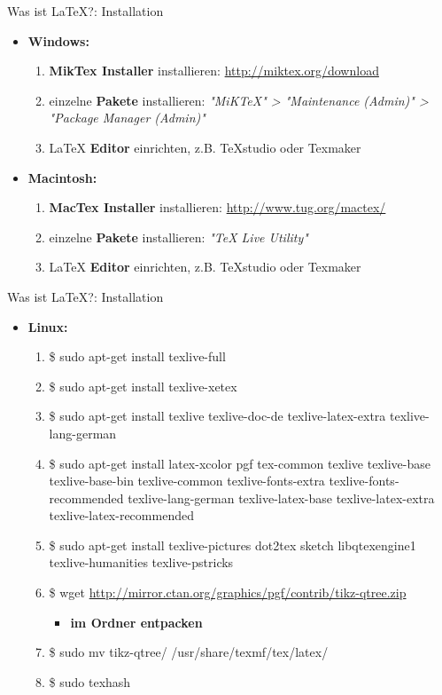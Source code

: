 \begin{frame}{Was ist \LaTeX?: Installation}
\begin{itemize}
\item \textbf{Windows:}
\begin{enumerate}
\item \textbf{MikTex Installer} installieren: \url{http://miktex.org/download}
\item einzelne \textbf{Pakete} installieren: \textit{"MiKTeX" > "Maintenance (Admin)" > "Package Manager (Admin)"}
\item \LaTeX{} \textbf{Editor} einrichten, z.B. TeXstudio oder Texmaker
\newline
\end{enumerate}
\item \textbf{Macintosh:}
\begin{enumerate}
\item \textbf{MacTex Installer} installieren: \url{http://www.tug.org/mactex/}
\item einzelne \textbf{Pakete} installieren: \textit{"TeX Live Utility"}
\item \LaTeX{} \textbf{Editor} einrichten, z.B. TeXstudio oder Texmaker
\end{enumerate}
\end{itemize}
\end{frame}

\begin{frame}{Was ist \LaTeX?: Installation}
\begin{itemize}
\item \textbf{Linux:}
\begin{enumerate}
\item \$ sudo apt-get install texlive-full
\item \$ sudo apt-get install texlive-xetex
\item \$ sudo apt-get install texlive texlive-doc-de texlive-latex-extra texlive-lang-german
\item \$ sudo apt-get install latex-xcolor pgf tex-common texlive texlive-base texlive-base-bin texlive-common texlive-fonts-extra texlive-fonts-recommended texlive-lang-german texlive-latex-base texlive-latex-extra texlive-latex-recommended
\item \$ sudo apt-get install texlive-pictures dot2tex sketch libqtexengine1 texlive-humanities texlive-pstricks
\item \$ wget \url{http://mirror.ctan.org/graphics/pgf/contrib/tikz-qtree.zip}
\begin{itemize}
\item \textbf{im Ordner entpacken}
\end{itemize}

\item \$ sudo mv tikz-qtree/ /usr/share/texmf/tex/latex/
\item \$ sudo texhash
\end{enumerate}
\end{itemize}
\end{frame}
